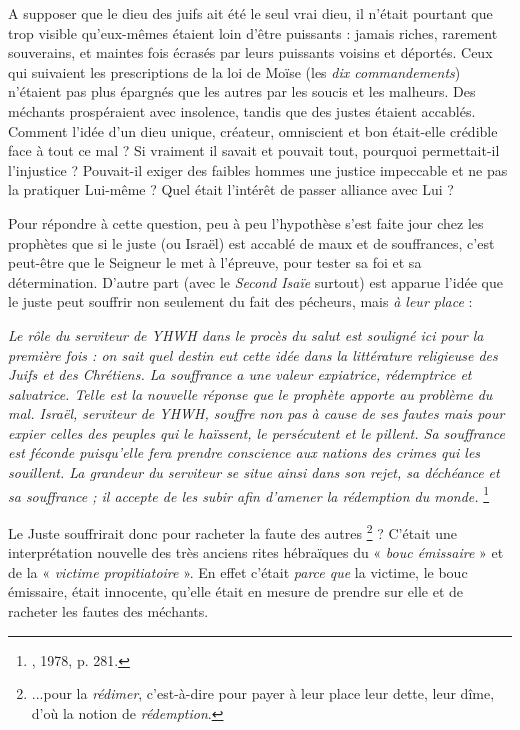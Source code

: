  A supposer que le dieu des juifs ait été le seul vrai dieu, il n'était pourtant que trop visible qu'eux-mêmes étaient loin d'être puissants : jamais riches, rarement souverains, et maintes fois écrasés par leurs puissants voisins et déportés. Ceux qui suivaient les prescriptions de la loi de Moïse (les \emph{dix commandements}) n'étaient pas plus épargnés que les autres par les soucis et les malheurs. Des méchants prospéraient avec insolence, tandis que des justes étaient accablés. Comment l'idée d'un dieu unique, créateur, omniscient et bon était-elle crédible face à tout ce mal ? Si vraiment il savait et pouvait tout, pourquoi permettait-il l'injustice ? Pouvait-il exiger des faibles hommes une justice impeccable et ne pas la pratiquer Lui-même ? Quel était l'intérêt de passer alliance avec Lui ? 

 Pour répondre à cette question, peu à peu l'hypothèse s'est faite jour chez les prophètes que si le juste (ou Israël) est accablé de maux et de souffrances, c'est peut-être que le Seigneur le met à l'épreuve, pour tester sa foi et sa détermination. D'autre part (avec le \emph{Second Isaïe} surtout) est apparue l'idée que le juste peut souffrir non seulement du fait des pécheurs, mais \emph{à leur place} :

\begin{displayquote}
{\emph{Le rôle du serviteur de YHWH dans le procès du salut est souligné ici pour la première fois : on sait quel destin eut cette idée dans la littérature religieuse des Juifs et des Chrétiens. La souffrance a une valeur expiatrice, rédemptrice et salvatrice. Telle est la nouvelle réponse que le prophète apporte au problème du mal. Israël, serviteur de YHWH, souffre non pas à cause de ses fautes mais pour expier celles des peuples qui le haïssent, le persécutent et le pillent. Sa souffrance est féconde puisqu'elle fera prendre conscience aux nations des crimes qui les souillent. La grandeur du serviteur se situe ainsi dans son rejet, sa déchéance et sa souffrance ; il accepte de les subir afin d'amener la rédemption du monde.}%
\footnote{, 1978, p. 281.}%
}
\end{displayquote}

Le Juste souffrirait donc pour racheter la faute des autres \footnote{...pour la \emph{rédimer}, c'est-à-dire pour payer à leur place leur dette, leur dîme, d'où la notion de \emph{rédemption}.}%
? C'était une interprétation nouvelle des très anciens rites hébraïques du « \emph{bouc émissaire} » et de la « \emph{victime propitiatoire} ». En effet c'était \emph{parce que} la victime, le bouc émissaire, était innocente, qu'elle était en mesure de prendre sur elle et de racheter les fautes des méchants. 

